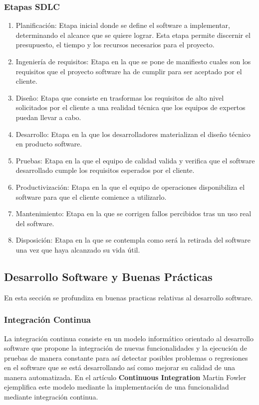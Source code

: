 \documentclass[a4paper,11pt]{book}
\begin{document}
\subsubsection{Etapas SDLC}

\begin{enumerate}
\item  Planificación: Etapa inicial donde se define el software a implementar, determinando el alcance que se quiere lograr. Esta etapa permite discernir el presupuesto, el tiempo y los recursos necesarios para el proyecto. 
\item Ingeniería de requisitos: Etapa en la que se pone de manifiesto cuales son los requisitos que el proyecto software ha de cumplir para ser aceptado por el cliente. 
\item Diseño: Etapa que consiste en trasformas los requisitos de alto nivel solicitados por el cliente a una realidad técnica que los equipos de expertos puedan llevar a cabo. 
\item Desarrollo: Etapa en la que los desarrolladores materializan el diseño técnico en producto software. 
\item Pruebas: Etapa en la que el equipo de calidad valida y verifica que el software desarrollado cumple los requisitos esperados por el cliente. 
\item Productivización:  Etapa en la que el equipo de operaciones disponibiliza el software para que el cliente comience a utilizarlo.
\item Mantenimiento: Etapa en la que se corrigen fallos percibidos tras un uso real del software. 
\item Disposición: Etapa en la que se contempla como será la retirada del software una vez que haya alcanzado su vida útil. 
\end{enumerate}

\subsection{Desarrollo Software y Buenas Prácticas }

En esta sección se profundiza en buenas practicas relativas al desarrollo software.

\subsubsection{Integración Continua}
 
La integración continua consiste en un modelo informático orientado al desarrollo software que propone la integración de nuevas funcionalidades y la ejecución de pruebas de manera constante para así detectar posibles problemas o regresiones en el software que se está desarrollando así como mejorar su calidad de una manera automatizada. En el artículo \textbf{Continuous Integration}\cite{ci}   Martin Fowler ejemplifica este modelo mediante la implementación de una funcionalidad mediante integración continua. 
\end{document}
